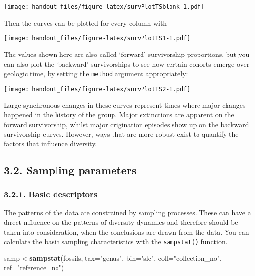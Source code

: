 \documentclass[]{article}
\newenvironment{Shaded}{\begin{snugshade}}{\end{snugshade}}
\newcommand{\CommentTok}[1]{\textcolor[rgb]{0.56,0.35,0.01}{\textit{#1}}}
\newcommand{\ControlFlowTok}[1]{\textcolor[rgb]{0.13,0.29,0.53}{\textbf{#1}}}
\newcommand{\DataTypeTok}[1]{\textcolor[rgb]{0.13,0.29,0.53}{#1}}
\newcommand{\DecValTok}[1]{\textcolor[rgb]{0.00,0.00,0.81}{#1}}
\newcommand{\KeywordTok}[1]{\textcolor[rgb]{0.13,0.29,0.53}{\textbf{#1}}}
\newcommand{\NormalTok}[1]{#1}
\newcommand{\OperatorTok}[1]{\textcolor[rgb]{0.81,0.36,0.00}{\textbf{#1}}}
\newcommand{\StringTok}[1]{\textcolor[rgb]{0.31,0.60,0.02}{#1}}
\begin{document}
\texttt{[image: handout\_files/figure-latex/survPlotTSblank-1.pdf]}

Then the curves can be plotted for every column with

\begin{Shaded}
\end{Shaded}

\texttt{[image: handout\_files/figure-latex/survPlotTS1-1.pdf]}

The values shown here are also called `forward' survivorship
proportions, but you can also plot the `backward' survivorships to see
how certain cohorts emerge over geologic time, by setting the
\texttt{method} argument appropriately:

\texttt{[image: handout\_files/figure-latex/survPlotTS2-1.pdf]}

Large synchronous changes in these curves represent times where major
changes happened in the history of the group. Major extinctions are
apparent on the forward survivorship, whilst major origination episodes
show up on the backward survivorship curves. However, ways that are more
robust exist to quantify the factors that influence diversity.

\hypertarget{sampling-parameters}{%
\subsection{3.2. Sampling parameters}\label{sampling-parameters}}

\hypertarget{basic-descriptors}{%
\subsubsection{3.2.1. Basic descriptors}\label{basic-descriptors}}

The patterns of the data are constrained by sampling processes. These
can have a direct influence on the patterns of diversity dynamics and
therefore should be taken into consideration, when the conclusions are
drawn from the data. You can calculate the basic sampling
characteristics with the \texttt{sampstat()} function.

\begin{Shaded}
\begin{Highlighting}[]
\NormalTok{samp <-}\KeywordTok{sampstat}\NormalTok{(fossils, }\DataTypeTok{tax=}\StringTok{"genus"}\NormalTok{, }\DataTypeTok{bin=}\StringTok{"slc"}\NormalTok{, }
  \DataTypeTok{coll=}\StringTok{"collection_no"}\NormalTok{, }\DataTypeTok{ref=}\StringTok{"reference_no"}\NormalTok{)}
\end{Highlighting}
\end{Shaded}
\end{document}
